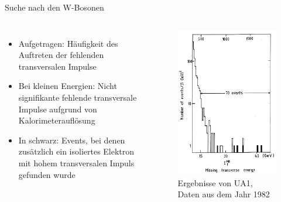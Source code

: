 \documentclass[aspectratio=1610, professionalfonts, 10pt]{beamer}
\begin{document}
\begin{frame}[plain]{Suche nach den W-Bosonen}
		\vspace*{-40px}
	\begin{columns}
			\begin{itemize}
				\setlength\itemsep{0.5em}
				\item Aufgetragen: Häufigkeit des Auftreten der fehlenden transversalen Impulse
				\item Bei kleinen Energien: Nicht signifikante fehlende transversale Impulse aufgrund von Kalorimeterauflösung
				\item In schwarz: Events, bei denen zusätzlich ein isoliertes Elektron mit hohem transversalen Impuls gefunden wurde
			\end{itemize}
			\begin{figure}
	  			\centering
				\includegraphics[width=0.65\textheight]{Images/Screenshot_2018-12-04_18-09-05.png}
				\caption{Ergebnisse von UA1, Daten aus dem Jahr 1982 \cite{doi:10.1142/9789814644150_0006}}
	  			\label{fig:sad}
			\end{figure}
	\end{columns}
\end{frame}
\end{document}
